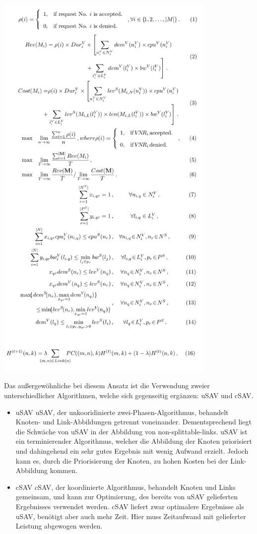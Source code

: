 \documentclass{lni}
\begin{document}
\begin{center}
	\includegraphics[width=0.8\textwidth]{algo2.pdf}\newline
\end{center}

Das außergewöhnliche bei diesem Ansatz ist die Verwendung zweier unterschiedlicher Algorithmen, welche sich gegenseitig ergänzen: uSAV und cSAV.
\begin{itemize}
	\item uSAV \newline
	uSAV, der unkooridinierte zwei-Phasen-Algorithmus, behandelt Knoten- und Link-Abbildungen getrennt voneinander. Dementsprechend liegt die Schwäche von uSAV in der Abbildung von non-splittable-links. uSAV ist ein terminierender Algorithmus, welcher die Abbildung der Knoten priorisiert und dahingehend ein sehr gutes Ergebnis mit wenig Aufwand erzielt. Jedoch kann es, durch die Priorisierung der Knoten, zu hohen Kosten bei der Link-Abbildung kommen.

	\item cSAV \newline
	cSAV, der koordinierte Algorithmus, behandelt Knoten und Links gemeinsam, und kann zur Optimierung, des bereits von uSAV gelieferten Ergebnisses verwendet werden. cSAV liefert zwar optimalere Ergebnisse als uSAV, benötigt aber auch mehr Zeit. Hier muss Zeitaufwand mit gelieferter Leistung abgewogen werden.

\end{itemize} 
\end{document}
